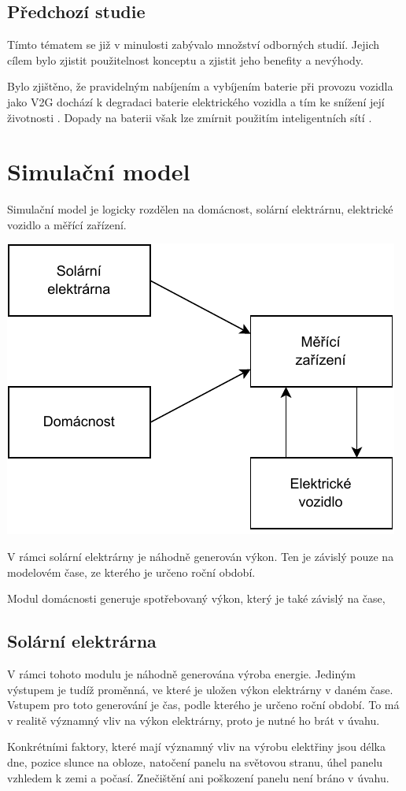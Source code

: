 \documentclass[12pt,a4paper]{Cotmas-2018}
\begin{document}
\subsection{Předchozí studie}
Tímto tématem se již v minulosti zabývalo množství odborných studií. Jejich cílem bylo zjistit použitelnost konceptu a zjistit jeho benefity a nevýhody. 

Bylo zjištěno, že pravidelným nabíjením a vybíjením baterie při provozu vozidla jako V2G dochází k degradaci baterie elektrického vozidla a tím ke snížení její životnosti 
\cite{Shirazi-2018}.
Dopady na baterii však lze zmírnit použitím inteligentních sítí 
\cite{University-of-Warwick-2017}.

\section{Simulační model}
Simulační model je logicky rozdělen na domácnost, solární elektrárnu, elektrické vozidlo a měřící zařízení.

\bigskip
\includegraphics[width=0.5\linewidth]{img/diagram.pdf}
\bigskip

V rámci solární elektrárny je náhodně generován výkon.
Ten je závislý pouze na modelovém čase, ze kterého je určeno roční období.

Modul domácnosti generuje spotřebovaný výkon, který je také závislý na čase,

\subsection{Solární elektrárna}
V rámci tohoto modulu je náhodně generována výroba energie.
Jediným výstupem je tudíž proměnná, ve které je uložen výkon elektrárny v daném čase.
Vstupem pro toto generování je čas, podle kterého je určeno roční období.
To má v realitě významný vliv na výkon elektrárny, proto je nutné ho brát v úvahu.

Konkrétními faktory, které mají významný vliv na výrobu elektřiny jsou délka dne, pozice slunce na obloze, natočení panelu na světovou stranu, úhel panelu vzhledem k zemi a počasí. Znečištění ani poškození panelu není bráno v úvahu.
\end{document}
